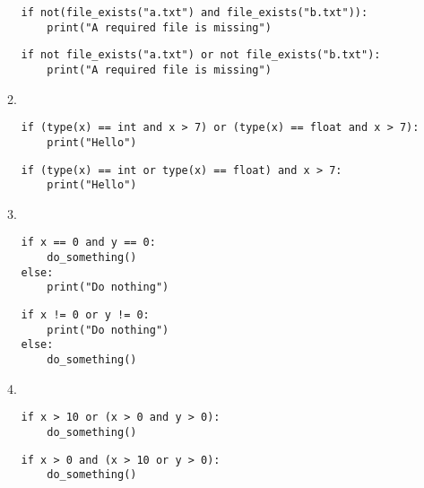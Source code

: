 \documentclass{../../../fal_assignment}
\begin{document}
\begin{enumerate}
\begin{enumerate}
                \begin{lstlisting}
if not(file_exists("a.txt") and file_exists("b.txt")):
    print("A required file is missing")
                \end{lstlisting}
                \begin{lstlisting}
if not file_exists("a.txt") or not file_exists("b.txt"):
    print("A required file is missing")
                \end{lstlisting}
            \item {\ }
                \begin{lstlisting}
if (type(x) == int and x > 7) or (type(x) == float and x > 7):
    print("Hello")
                \end{lstlisting}
                \begin{lstlisting}
if (type(x) == int or type(x) == float) and x > 7:
    print("Hello")
                \end{lstlisting}
            \item {\ }
                \begin{lstlisting}
if x == 0 and y == 0:
    do_something()
else:
    print("Do nothing")
                \end{lstlisting}
                \begin{lstlisting}
if x != 0 or y != 0:
    print("Do nothing")
else:
    do_something()
                \end{lstlisting}
            \item {\ }
                \begin{lstlisting}
if x > 10 or (x > 0 and y > 0):
    do_something()
                \end{lstlisting}
                \begin{lstlisting}
if x > 0 and (x > 10 or y > 0):
    do_something()
                \end{lstlisting}
        \end{enumerate}
\end{enumerate}
\end{document}
